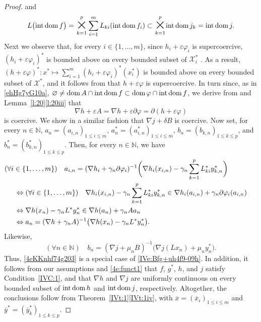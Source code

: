 \documentclass[a4paper,11pt,fleqn]{article}
\renewcommand{\leq}{\ensuremath{\leqslant}}
\newcommand{\XX}{\ensuremath{{\mathcal X}}}
\newcommand{\emp}{\ensuremath{{\varnothing}}}
\newcommand{\NN}{\ensuremath{\mathbb N}}
\newcommand{\dom}{\ensuremath{\text{\rm dom}\,}}
\newcommand{\Cart}{\ensuremath{\raisebox{-0.5mm}{\mbox{\huge{$\times$}}}}}
\newcommand{\inte}{\ensuremath{\text{\rm int}\,}}
\newcommand{\intdom}{\ensuremath{\text{\rm int\,dom}\,}}
\theoremstyle{plain}{\theorembodyfont{\rmfamily}%
\newtheorem{conjecture}[theorem]{Conjecture}}
\theoremstyle{plain}{\theorembodyfont{\rmfamily}%
\newtheorem{example}[theorem]{Example}}
\theoremstyle{plain}{\theorembodyfont{\rmfamily}%
\newtheorem{remark}[theorem]{Remark}}
\theoremstyle{plain}{\theorembodyfont{\rmfamily}%
\newtheorem{algorithm}[theorem]{Algorithm}}
\theoremstyle{plain}{\theorembodyfont{\rmfamily}%
\newtheorem{condition}[theorem]{Condition}}
\theoremstyle{plain}{\theorembodyfont{\rmfamily}%
\newtheorem{definition}[theorem]{Definition}}
\theoremstyle{plain}{\theorembodyfont{\rmfamily}
\newtheorem{problem}[theorem]{Problem}}
\theoremstyle{plain}{\theorembodyfont{\rmfamily}
\newtheorem{notation}[theorem]{Notation}}
\numberwithin{equation}{section}
\begin{document}
\begin{proof}
and 
\begin{equation}
\label{ekIuh711b}
L\big(\intdom f\big)=\underset{k=1}{\overset{p}{\Cart}}
\sum_{i=1}^m L_{ki}(\intdom f_i)\subset
\underset{k=1}{\overset{p}{\Cart}}\inte\dom j_k=\intdom j.
\end{equation}
Next we observe that, for every $i\in\{1,\ldots,m\}$, since 
$h_i+\varepsilon\varphi_i$ is supercoercive, 
$(h_i+\varepsilon\varphi_i)^*$ is bounded above on
every bounded subset of $\XX_i^*$ \cite[Theorem~3.3]{Ccm01}.
As a result, 
$(h+\varepsilon\varphi)^*\colon x^*\mapsto\sum_{i=1}^m
(h_i+\varepsilon\varphi_i)^*(x_i^*)$ 
is bounded above on every bounded subset of $\XX^*$, and it follows
from \cite[Theorem~3.3]{Ccm01} that $h+\varepsilon\varphi$ is
supercoercive. In turn since, as in \eqref{ehHg7yG10a},
$\emp\neq\dom A\cap\intdom f\subset
\dom\varphi\cap\intdom f$, we derive from 
\cite[Theorem~2.8.3]{IVZali02}
and Lemma~\ref{l:20}\ref{l:20iii} that
\begin{equation}
\label{ekIuh713}
\nabla h+\varepsilon A=\nabla h+\varepsilon\partial\varphi=
\partial(h+\varepsilon\varphi) 
\end{equation}
is coercive. We show in a similar fashion that $\nabla j+\delta B$ 
is coercive. Now set, for every $n\in\NN$, 
$a_n=(a_{i,n})_{1\leq i\leq m}$, 
$a_n^*=(a_{i,n}^*)_{1\leq i\leq m}$, 
$b_n=(b_{k,n})_{1\leq k\leq p}$, and
$b_n^*=(b_{k,n}^*)_{1\leq k\leq p}$. Then, for every $n\in\NN$,
we have
\begin{align}
&\hskip -5mm (\forall i\in\{1,\ldots,m\})\quad
a_{i,n}=(\nabla h_i+\gamma_n\partial\varphi_i)^{-1}\bigg(\nabla
h_i(x_{i,n})-\gamma_n\sum_{k=1}^pL_{ki}^*y_{k,n}^*\bigg)\nonumber\\
&\Leftrightarrow (\forall i\in\{1,\ldots,m\})\quad 
\nabla h_i(x_{i,n})-\gamma_n\sum_{k=1}^pL_{ki}^*y_{k,n}^*
\in\nabla h_i(a_{i,n})+\gamma_n\partial\varphi_i(a_{i,n})
\nonumber\\
&\Leftrightarrow\nabla h(x_n)-\gamma_nL^*y_n^*
\in\nabla h(a_n)+\gamma_nAa_n\nonumber\\
&\Leftrightarrow a_n=(\nabla h+\gamma_nA)^{-1}\big(\nabla h(x_n)
-\gamma_nL^*y_n^*\big).
\end{align}
Likewise,
\begin{equation}
(\forall n\in\NN)\quad 
b_n=(\nabla j+\mu_nB)^{-1}\big(\nabla j(Lx_n)+\mu_ny_n^*\big).
\end{equation}
Thus, \eqref{4eKKnhf74g203} is a special case of 
\eqref{IVe:Bfg+uh4f9-09h}. In addition, it follows from our
assumptions and \eqref{4e:funct1} that $f$, $g^*$, $h$, and $j$ 
satisfy Condition~\ref{IVC:1}, and that $\nabla h$ and $\nabla j$ 
are uniformly continuous on every bounded subset of $\intdom h$ 
and $\intdom j$, respectively. Altogether, the conclusions follow
from Theorem~\ref{IVt:1}\ref{IVt:1iv}, with 
$\overline{x}=(\overline{x}_i)_{1\leq i\leq m}$ and
$\overline{y}^*=(\overline{y}_k^*)_{1\leq k\leq p}$.
\end{proof}
\end{document}
